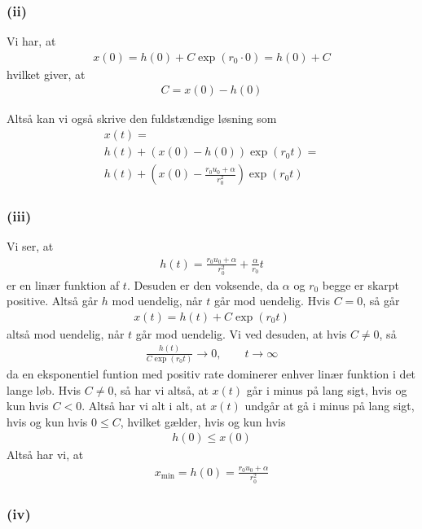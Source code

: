 \documentclass[12pt]{article}
\begin{document}
\subsubsection{(ii)}

Vi har, at
\begin{align}
x(0) = h(0) + C\exp(r_0\cdot 0) = h(0) + C
\end{align}
hvilket giver, at
\begin{align}
C = x(0) - h(0)
\end{align}

Altså kan vi også skrive den fuldstændige løsning som
\begin{align}
x(t) = \\ h(t) + (x(0) - h(0))\exp(r_0t) = \\ h(t) + \left(x(0) - \frac{r_0u_0 + \alpha}{r_0^2}\right)\exp(r_0t)
\end{align}

\subsubsection{(iii)}

Vi ser, at 
\begin{align}
h(t) = \frac{r_0u_0 + \alpha}{r_0^2} + \frac{\alpha }{r_0}t 
\end{align}
er en linær funktion af $t$. Desuden er den voksende, da $\alpha$ og $r_0$ begge er skarpt positive. Altså går $h$ mod uendelig, når $t$ går mod uendelig. Hvis $C = 0$, så går
\begin{align}
x(t) = h(t) + C\exp(r_0 t)
\end{align}
altså mod uendelig, når $t$ går mod uendelig. Vi ved desuden, at hvis $C\neq 0$, så
\begin{align}
\frac{h(t)}{C\exp(r_0t)} \to 0, \qquad t\to \infty
\end{align}
da en eksponentiel funtion med positiv rate dominerer enhver linær funktion i det lange løb. Hvis $C\neq 0$, så har vi altså, at $x(t)$ går i minus på lang sigt, hvis og kun hvis $C<0$. Altså har vi alt i alt, at $x(t)$ undgår at gå i minus på lang sigt, hvis og kun hvis $0 \leq C$, hvilket gælder, hvis og kun hvis
\begin{align}
h(0) \leq x(0)
\end{align}
Altså har vi, at
\begin{align}
x_{\min} = h(0) = \frac{r_0u_0 + \alpha}{r_0^2}
\end{align}

\subsubsection{(iv)}
\end{document}
